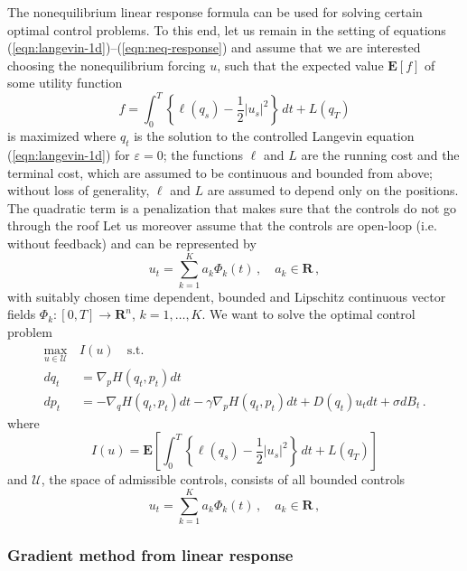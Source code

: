 \documentclass[]{tMPH2e}
\newcommand{\R}{{\mathbf R}}
\newcommand{\eps}{\varepsilon}
\newcommand{\cU}{\mathcal U}
\newcommand{\bE}{{\mathbf E}}
\begin{document}
The nonequilibrium linear response formula can be used for solving certain optimal control problems. To this end, let us remain in the setting of equations (\ref{eqn:langevin-1d})--(\ref{eqn:neq-response}) and assume that we are interested choosing the nonequilibrium forcing $u$, such that the expected value $\bE[f]$ of some utility function 
\[
f = \int_{0}^{T}\left\{\ell (q_{s}) - \frac{1}{2}|u_{s}|^{2}\right\}\,dt + L(q_{T}) 
\]
is maximized where $q_{t}$ is the solution to the controlled Langevin equation (\ref{eqn:langevin-1d}) for $\eps=0$; the functions $\ell$ and $L$ are the running cost and the terminal cost, which are assumed to be continuous and bounded from above; without loss of generality, $\ell$ and $L$ are assumed to depend only on the positions. The quadratic term is a penalization that makes sure that the controls do not go through the roof \cite{schuette2012,hartmann2012}  Let us moreover assume that the controls are open-loop (i.e. without feedback) and can be represented by 
\[
u_{t} = \sum_{k=1}^K a_k \Phi_k(t)\,,\quad a_{k}\in \R\,,
\]
with suitably chosen time dependent, bounded and Lipschitz continuous vector fields $\Phi_k\colon[0,T]\to\R^{n}$, $k=1,\ldots,K$. %
We want to solve the optimal control problem
\begin{equation}\label{ocp1}
\begin{aligned}
 \max_{u\in\cU} \,& I(u)\quad \textrm{s.t.}\\
dq_t & =  \nabla_p H(q_t,p_t)dt\\
dp_t & =  -\nabla_q H(q_t,p_t)dt - \gamma \nabla_p H(q_t,p_t)dt + D(q_t)u_{t} dt+\sigma dB_t\,.
\end{aligned}
\end{equation}
where 
\begin{equation}\label{ocp2}
I(u) = \bE\left[\int_{0}^{T}\left\{\ell (q_{s}) - \frac{1}{2}|u_{s}|^{2}\right\}\,dt + L(q_{T}) \right]
\end{equation}
and $\cU$, the space of admissible controls, consists of all bounded controls 
\begin{equation}\label{admissible}
u_{t} = \sum_{k=1}^K a_k \Phi_k(t)\,,\quad a_{k}\in \R\,,
\end{equation}


\subsubsection*{Gradient method from linear response}
\end{document}
